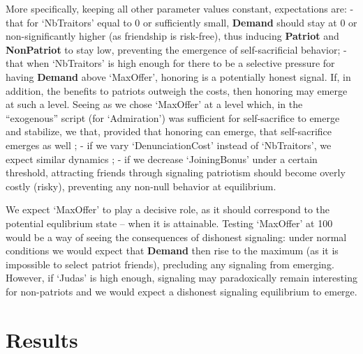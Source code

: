 \documentclass[a4paper,12pt]{report}
\begin{document}
More specifically, keeping all other parameter values constant, expectations are:
- that for ‘NbTraitors’ equal to 0 or sufficiently small, \textbf{Demand} should stay at 0 or non-significantly higher (as friendship is risk-free), thus inducing \textbf{Patriot} and \textbf{NonPatriot} to stay low, preventing the emergence of self-sacrificial behavior;
- that when ‘NbTraitors’ is high enough for there to be a selective pressure for having \textbf{Demand} above ‘MaxOffer’, honoring is a potentially honest signal. If, in addition, the benefits to patriots outweigh the costs, then honoring may emerge at such a level. Seeing as we chose ‘MaxOffer’ at a level which, in the “exogenous” script (for ‘Admiration’) was sufficient for self-sacrifice to emerge and stabilize, we that, provided that honoring can emerge, that self-sacrifice emerges as well ;
- if we vary ‘DenunciationCost’ instead of ‘NbTraitors’, we expect similar dynamics ;
- if we decrease ‘JoiningBonus’ under a certain threshold, attracting friends through signaling patriotism should become overly costly (risky), preventing any non-null behavior at equilibrium.

We expect ‘MaxOffer’ to play a decisive role, as it should correspond to the potential equlibrium state – when it is attainable. Testing ‘MaxOffer’ at 100 would be a way of seeing the consequences of dishonest signaling: under normal conditions we would expect that \textbf{Demand} then rise to the maximum (as it is impossible to select patriot friends), precluding any signaling from emerging. However, if ‘Judas’ is high enough, signaling may paradoxically remain interesting for non-patriots and we would expect a dishonest signaling equilibrium to emerge.

















\chapter{Results}
\end{document}

